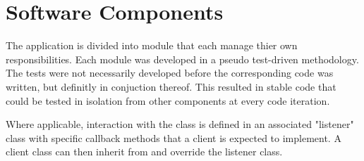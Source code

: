 \section{Software Components}

The application is divided into module that each manage thier own responsibilities. Each module was developed in a pseudo test-driven methodology. The tests were not necessarily developed before the corresponding code was written, but definitly in conjuction thereof. This resulted in stable code that could be tested in isolation from other components at every code iteration.

 Where applicable, interaction with the class is defined in an associated "listener" class with specific callback methods that a client is expected to implement. A client class can then inherit from and override the listener class.

